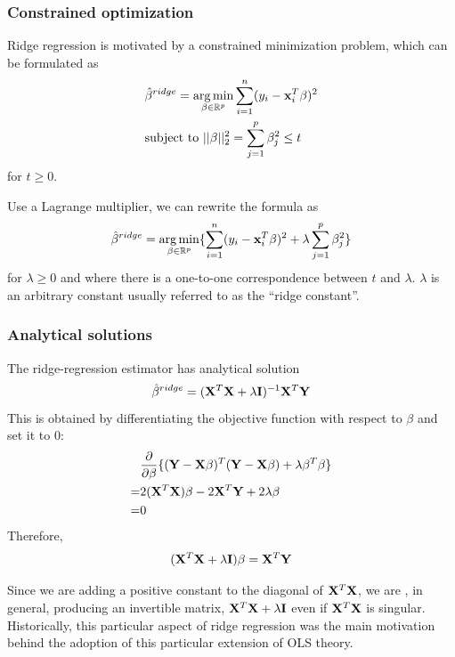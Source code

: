 \subsubsection*{Constrained optimization}

Ridge regression is motivated by a constrained minimization problem, which can be formulated as
$$
\begin{aligned}
&\hat{\beta}^{ridge} = \operatorname*{arg\,min}\limits_{\beta \in \mathbb{R}^p} \sum\limits_{i = 1}^n(y_i - \mathbf{x}_i^T \beta)^2\\
&\mbox{subject to } ||\beta||_2^2 = \sum\limits_{j = 1}^p \beta_j^2 \le t \\
\end{aligned}
$$
for $t \ge 0$.  

Use a Lagrange multiplier, we can rewrite the formula as
$$
\hat{\beta}^{ridge} =\operatorname*{arg\,min}\limits_{\beta \in \mathbb{R}^p} \{  \sum\limits_{i = 1}^n(y_i - \mathbf{x}_i^T \beta)^2 + \lambda \sum\limits_{j = 1}^p \beta_j^2\}
$$
for $\lambda \ge 0$ and where there is a one-to-one correspondence between $t$ and $\lambda$.
$\lambda$ is an arbitrary constant usually referred to as the ``ridge constant''.

\subsubsection*{Analytical solutions}
The ridge-regression estimator has analytical solution
$$
\hat{\beta}^{ridge} = (\mathbf{X}^T\mathbf{X} + \lambda \mathbf{I})^{-1} \mathbf{X}^T \mathbf{Y}
$$
This is obtained by differentiating the objective function with respect to $\beta$ and set it to $0$:
$$
\begin{aligned}
&\frac{\partial}{\partial \beta} \{(\mathbf{Y} - \mathbf{X}\beta)^T (\mathbf{Y} - \mathbf{X}\beta) +\lambda \mathbf{\beta}^T \mathbf{\beta}\}\\
=& 2(\mathbf{X}^T \mathbf{X}) \beta - 2 \mathbf{X}^T \mathbf{Y} + 2\lambda \beta \\
=& 0\\
\end{aligned}
$$
Therefore,
$$
(\mathbf{X}^T\mathbf{X} + \lambda \mathbf{I})\mathbf{\beta} = \mathbf{X}^T\mathbf{Y}
$$

Since we are adding a positive constant to the diagonal of $\mathbf{X}^T\mathbf{X}$, we  are , in general, producing an invertible matrix, $\mathbf{X}^T\mathbf{X} + \lambda\mathbf{I}$ even if $\mathbf{X}^T\mathbf{X}$ is singular.  Historically, this particular aspect of ridge regression was the main motivation behind the adoption of this particular extension of OLS theory.

